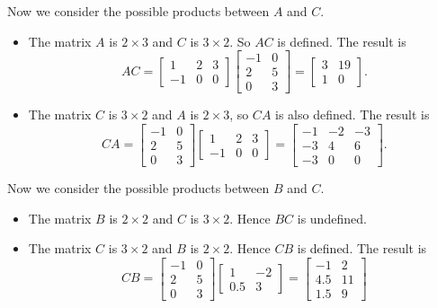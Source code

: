 \documentclass[12pt]{article}
\begin{document}
	Now we consider the possible products between $A$ and $C$.
	\begin{itemize}
		\item The matrix $A$ is $2 \times 3$ and $C$ is $3 \times 2$. So $AC$ is defined. The result is
			\[
				AC = \begin{bmatrix}1 & 2 & 3\\-1 & 0 & 0\end{bmatrix}\begin{bmatrix}-1 & 0\\2 & 5\\0 & 3\end{bmatrix}= \begin{bmatrix}3 & 19\\1 & 0\end{bmatrix} .
			\]
		\item The matrix $C$ is $3 \times 2$ and $A$ is $2 \times 3$, so $CA$ is also defined. The result is
			\[
				CA = \begin{bmatrix}-1 & 0\\2 & 5\\0 & 3\end{bmatrix}\begin{bmatrix}1 & 2 & 3\\-1 & 0 & 0\end{bmatrix} = \begin{bmatrix}-1 & -2 & -3\\-3 & 4 & 6\\-3 & 0 & 0\end{bmatrix} .
			\]
	\end{itemize}

	Now we consider the possible products between $B$ and $C$.
	\begin{itemize}
		\item The matrix $B$ is $2 \times 2$ and $C$ is $3 \times 2$. Hence $BC$ is undefined.
		\item The matrix $C$ is $3 \times 2$ and $B$ is $2 \times 2$. Hence $CB$ is defined. The result is
			\[
				CB = \begin{bmatrix}-1 & 0\\2 & 5\\0 & 3\end{bmatrix}\begin{bmatrix}1 & -2\\0.5 & 3\end{bmatrix} = \begin{bmatrix}-1 & 2\\4.5 & 11\\1.5 & 9\end{bmatrix}
			\]
	\end{itemize}
\end{document}
